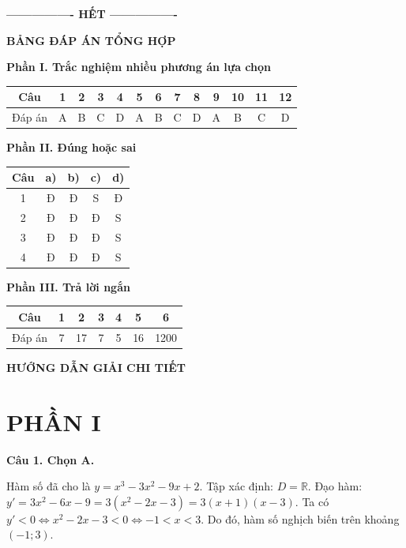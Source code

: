 \documentclass[12pt,a4paper]{article}
\newcommand{\loigiai}[1]{\par\medskip\Needspace{4\baselineskip}\noindent\textbf{#1}\par\nobreak}
\begin{document}
\begin{center}\textbf{---------------- HẾT ----------------}\end{center}

\newpage\pagestyle{answers}
\begin{center}\Large\textbf{BẢNG ĐÁP ÁN TỔNG HỢP}\end{center}
\textbf{Phần I. Trắc nghiệm nhiều phương án lựa chọn}
\begin{center}
\renewcommand{\arraystretch}{1.5}
\begin{tabular}{|c|*{12}{c|}}\hline
Câu & 1&2&3&4&5&6&7&8&9&10&11&12\\\hline
Đáp án & A & B & C & D & A & B & C & D & A & B & C & D \\\hline
\end{tabular}
\end{center}

\textbf{Phần II. Đúng hoặc sai}
\begin{center}
\renewcommand{\arraystretch}{1.4}
\begin{tabular}{|c|c|c|c|c|}\hline
Câu & a) & b) & c) & d)\\\hline
1 & Đ & Đ & S & Đ\\\hline
2 & Đ & Đ & Đ & S\\\hline
3 & Đ & Đ & Đ & S\\\hline
4 & Đ & Đ & Đ & S\\\hline
\end{tabular}
\end{center}

\textbf{Phần III. Trả lời ngắn}
\begin{center}
\renewcommand{\arraystretch}{1.5}
\begin{tabular}{|c|c|c|c|c|c|c|}\hline
Câu & 1 & 2 & 3 & 4 & 5 & 6\\\hline
Đáp án & 7 & 17 & 7 & 5 & 16 & 1200 \\\hline
\end{tabular}
\end{center}

\vspace{0.5cm}
\begin{center}
\large\textbf{HƯỚNG DẪN GIẢI CHI TIẾT}
\end{center}

\section*{PHẦN I}

\loigiai{Câu 1. Chọn A.}
Hàm số đã cho là $y=x^3-3x^2-9x+2$.
Tập xác định: $D=\mathbb{R}$.
Đạo hàm: $y'=3x^2-6x-9=3(x^2-2x-3)=3(x+1)(x-3)$.
Ta có $y'<0 \iff x^2-2x-3 < 0 \iff -1 < x < 3$.
Do đó, hàm số nghịch biến trên khoảng $(-1;3)$.
\end{document}
